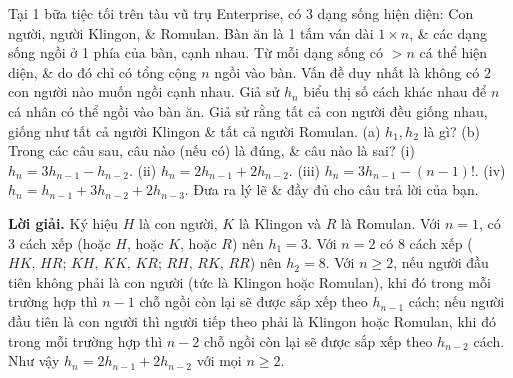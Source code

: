 \begin{tcolorbox}[breakable]
    \begin{baitoan}\label{pb:w08:36}
        Tại 1 bữa tiệc tối trên tàu vũ trụ Enterprise, có $3$ dạng sống hiện diện: Con người, người Klingon, \& Romulan. Bàn ăn là 1 tấm ván dài $1\times n$, \& các dạng sống ngồi ở 1 phía của bàn, cạnh nhau. Từ mỗi dạng sống có $> n$ cá thể hiện diện, \& do đó chỉ có tổng cộng $n$ ngồi vào bàn. Vấn đề duy nhất là không có $2$ con người nào muốn ngồi cạnh nhau. Giả sử $h_n$ biểu thị số cách khác nhau để $n$ cá nhân có thể ngồi vào bàn ăn. Giả sử rằng tất cả con người đều giống nhau, giống như tất cả người Klingon \& tất cả người Romulan. (a) $h_1,h_2$ là gì? (b) Trong các câu sau, câu nào (nếu có) là đúng, \& câu nào là sai? (i) $h_n = 3h_{n-1} - h_{n-2}$. (ii) $h_n = 2h_{n-1} + 2h_{n-2}$. (iii) $h_n = 3h_{n-1} - (n - 1)!$. (iv) $h_n = h_{n-1} + 3h_{n-2} + 2h_{n-3}$. Đưa ra lý lẽ \& đầy đủ cho câu trả lời của bạn.
    \end{baitoan}
\end{tcolorbox}

\textbf{Lời giải. }Ký hiệu $H$ là con người, $K$ là Klingon và $R$ là Romulan. Với $n=1$, có 3 cách xếp (hoặc $H$, hoặc $K$, hoặc $R$) nên $h_1 = 3$. Với $n=2$ có 8 cách xếp ($HK,\,HR;\,KH,\,KK,\,KR;\,RH,\,RK,\,RR$) nên $h_2=8$. Với $n\ge 2$, nếu người đầu tiên không phải là con người (tức là Klingon hoặc Romulan), khi đó trong mỗi trường hợp thì $n-1$ chỗ ngồi còn lại sẽ được sắp xếp theo $h_{n-1}$ cách; nếu người đầu tiên là con người thì người tiếp theo phải là Klingon hoặc Romulan, khi đó trong mỗi trường hợp thì $n-2$ chỗ ngồi còn lại sẽ được sắp xếp theo $h_{n-2}$ cách. Như vậy $h_n = 2h_{n-1}+2h_{n-2}$ với mọi $n\ge 2$.



